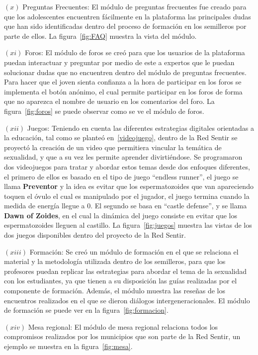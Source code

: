 \documentclass[journal,transmag]{IEEEtran}
\begin{document}
$(x)$ Preguntas Frecuentes: El módulo de preguntas frecuentes fue creado para que los adolescentes encuentren fácilmente en la plataforma las principales dudas que han sido identificadas dentro del proceso de formación en los semilleros por parte de ellos. La figura~\ref{fig:FAQ} muestra la vista del módulo.

$(xi)$ Foros: El módulo de foros se creó para que los usuarios de la plataforma puedan interactuar y preguntar por medio de este a expertos que le puedan solucionar dudas que no encuentren dentro del módulo de preguntas frecuentes. Para hacer que el joven sienta confianza a la hora de participar en los foros se implementa el botón anónimo, el cual permite participar en los foros de forma que no aparezca el nombre de usuario en los comentarios del foro. La figura~\ref{fig:foros} se puede observar como se ve el módulo de foros.

$(xii)$ Juegos: Teniendo en cuenta las diferentes estrategias digitales orientadas a la educación, tal como se planteó en~\ref{videojuego}, dentro de la Red Sentir se proyectó la creación de un video que permitiera vincular la temática de sexualidad, y que a su vez les permite aprender divirtiéndose. Se programaron dos videojuegos para tratar y abordar estos temas desde dos enfoques diferentes, el primero de ellos es basado en el tipo de juego ``endless runner'', el juego se llama \textbf{Preventor} y la idea es evitar que los espermatozoides que van apareciendo toquen el óvulo el cual es manipulado por el jugador, el juego termina cuando la medida de energía llegue a $0$. El segundo se basa en ``castle defense'', y se llama \textbf{Dawn of Zoides}, en el cual la dinámica del juego consiste en evitar que los espermatozoides lleguen al castillo.  La figura~\ref{fig:juegos} muestra las vistas de los dos juegos disponibles dentro del proyecto de la Red Sentir.

$(xiii)$ Formación: Se creó un módulo de formación en el que se relaciona el material y la metodología utilizada dentro de los semilleros, para que los profesores puedan replicar las estrategias para abordar el tema de la sexualidad con los estudiantes, ya que tienen a su disposición las guías realizadas por el componente de formación. Además, el módulo muestra las reseñas de los encuentros realizados en el que se dieron diálogos intergeneracionales. El módulo de formación se puede ver en la figura~\ref{fig:formacion}.

$(xiv)$ Mesa regional: El módulo de mesa regional relaciona todos los compromisos realizados por los municipios que son parte de la Red Sentir, un ejemplo se muestra en la figura~\ref{fig:mesa}.
\end{document}
